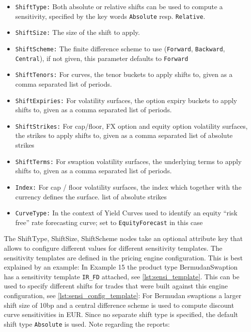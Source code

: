 \begin{itemize}
\item {\tt ShiftType:} Both absolute or relative shifts can be used to compute a sensitivity, specified by the key words
  {\tt Absolute} resp. {\tt Relative}.
\item {\tt ShiftSize:} The size of the shift to apply.
\item {\tt ShiftScheme:} The finite difference scheme to use ({\tt Forward}, {\tt Backward}, {\tt Central}), if not given, this parameter defaults to {\tt Forward}
\item {\tt ShiftTenors:} For curves, the tenor buckets to apply shifts to, given as a comma separated list of periods.
\item {\tt ShiftExpiries:} For volatility surfaces, the option expiry buckets to apply shifts to, given as a comma
  separated list of periods.
\item {\tt ShiftStrikes:} For cap/floor, FX option and equity option volatility surfaces, the strikes to apply shifts to, given as a comma separated
  list of absolute strikes
\item {\tt ShiftTerms:} For swaption volatility surfaces, the underlying terms to apply shifts to, given as a comma
  separated list of periods.
\item {\tt Index:} For cap / floor volatility surfaces, the index which together with the currency defines the surface.
  list of absolute strikes
\item {\tt CurveType:} In the context of Yield Curves used to identify an equity ``risk free'' rate forecasting curve; set to {\tt EquityForecast} in this case
\end{itemize}

The ShiftType, ShiftSize, ShiftScheme nodes take an optional attribute key that allows to configure different values for
different sensitivity templates. The sensitivity templates are defined in the pricing engine configuration. This is best
explained by an example: In Example 15 the product type BermudanSwaption has a sensitivity template \verb+IR_FD+
attached, see \ref{lst:sensi_template}. This can be used to specify different shifts for trades that were built against
this engine configuration, see \ref{lst:sensi_config_template}: For Bermudan swaptions a larger shift size of 10bp and a
central difference scheme is used to compute discount curve sensitivities in EUR. Since no separate shift type is
specified, the default shift type {\tt Absolute} is used. Note regarding the reports:

